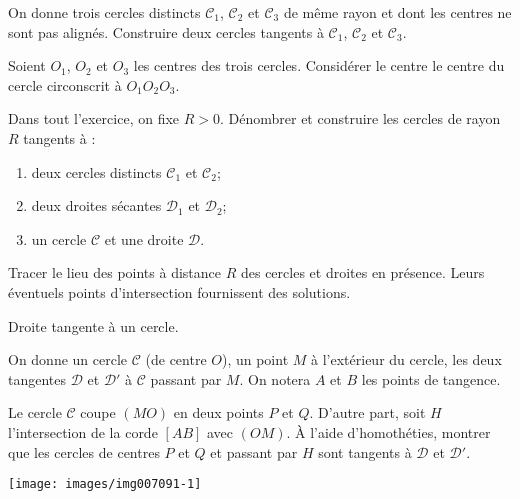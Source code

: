 \begin{exo}
On donne trois cercles distincts $\mathcal C_1$, $\mathcal C_2$ et $\mathcal C_3$ de même rayon et dont les centres ne sont pas alignés. Construire deux cercles tangents à $\mathcal C_1$, $\mathcal C_2$ et $\mathcal C_3$.


\begin{hint} 
Soient $O_1$, $O_2$ et $O_3$ les centres des trois cercles. Considérer le centre le centre du cercle circonscrit à $O_1O_2O_3$. \\
\end{hint}
  
\end{exo}  


\begin{exo}%
Dans tout l'exercice, on fixe $R>0$. Dénombrer et construire les cercles de rayon $R$ tangents à :
\begin{enumerate}
\item deux cercles distincts $\mathcal C_1$ et $\mathcal C_2$;
\item deux droites sécantes $\mathcal D_1$ et $\mathcal D_2$;
\item un cercle $\mathcal C$ et une droite $\mathcal D$.
\end{enumerate}


\begin{sol} Tracer le lieu des points à distance $R$ des cercles et droites en présence. Leurs éventuels points d'intersection fournissent des solutions.
\end{sol}  
\end{exo}  



\begin{exo} %
\begin{prerequis}Droite tangente à un cercle.\end{prerequis}


 On donne un cercle  $\mathcal C$ (de centre $O$), un point $M$ à l'extérieur du cercle, les deux tangentes $\mathcal D$ et $\mathcal D'$ à $\mathcal C$ passant par $M$. On notera $A$ et $B$ les points de tangence. 

Le cercle $\mathcal C$ coupe $(MO)$ en deux points $P$ et $Q$. D'autre part, soit $H$ l'intersection de la corde $[AB]$ avec $(OM)$. À l'aide d'homothéties, montrer que les cercles de centres $P$ et $Q$ et passant par $H$ sont tangents à $\mathcal D$ et $\mathcal D'$. 
\begin{center}
\texttt{[image: images/img007091-1]}
\end{center}
\end{exo}  



